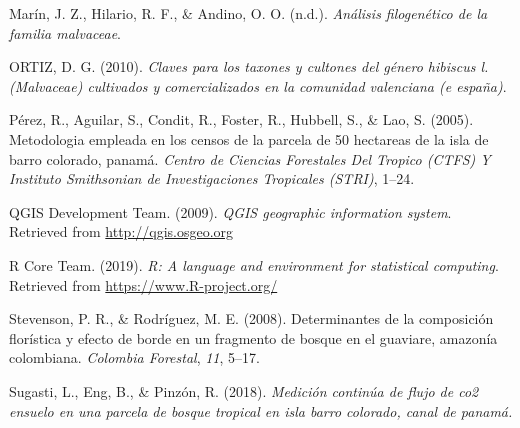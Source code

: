 \documentclass[11pt,]{article}
\begin{document}
\hypertarget{ref-marinanalisis}{}
Marín, J. Z., Hilario, R. F., \& Andino, O. O. (n.d.). \emph{Análisis
filogenético de la familia malvaceae}.

\hypertarget{ref-ortizclaves}{}
ORTIZ, D. G. (2010). \emph{Claves para los taxones y cultones del género
hibiscus l.(Malvaceae) cultivados y comercializados en la comunidad
valenciana (e españa)}.

\hypertarget{ref-perez2005metodologia}{}
Pérez, R., Aguilar, S., Condit, R., Foster, R., Hubbell, S., \& Lao, S.
(2005). Metodologia empleada en los censos de la parcela de 50 hectareas
de la isla de barro colorado, panamá. \emph{Centro de Ciencias
Forestales Del Tropico (CTFS) Y Instituto Smithsonian de Investigaciones
Tropicales (STRI)}, 1--24.

\hypertarget{ref-QGIS_software}{}
QGIS Development Team. (2009). \emph{QGIS geographic information
system}. Retrieved from \url{http://qgis.osgeo.org}

\hypertarget{ref-R}{}
R Core Team. (2019). \emph{R: A language and environment for statistical
computing}. Retrieved from \url{https://www.R-project.org/}

\hypertarget{ref-stevenson2008determinantes}{}
Stevenson, P. R., \& Rodríguez, M. E. (2008). Determinantes de la
composición florística y efecto de borde en un fragmento de bosque en el
guaviare, amazonía colombiana. \emph{Colombia Forestal}, \emph{11},
5--17.

\hypertarget{ref-sugastimedicion}{}
Sugasti, L., Eng, B., \& Pinzón, R. (2018). \emph{Medición continúa de
flujo de co2 ensuelo en una parcela de bosque tropical en isla barro
colorado, canal de panamá.}




\newpage
\singlespacing 
\end{document}
